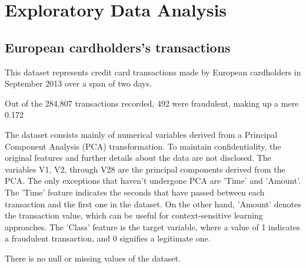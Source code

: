 \section{Exploratory Data Analysis}

\subsection{European cardholders's transactions}

This dataset represents credit card transactions made by European cardholders in September 2013 over a span of two days.

Out of the 284,807 transactions recorded, 492 were fraudulent, making up a mere 0.172%

The dataset consists mainly of numerical variables derived from a Principal Component Analysis (PCA) transformation. To maintain confidentiality, the original features and further details about the data are not disclosed. The variables V1, V2, through V28 are the principal components derived from the PCA. The only exceptions that haven't undergone PCA are 'Time' and 'Amount'. The 'Time' feature indicates the seconds that have passed between each transaction and the first one in the dataset. On the other hand, 'Amount' denotes the transaction value, which can be useful for context-sensitive learning approaches. The 'Class' feature is the target variable, where a value of 1 indicates a fraudulent transaction, and 0 signifies a legitimate one.

There is no null or missing values of the dataset.

